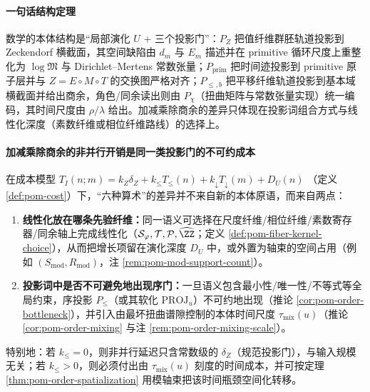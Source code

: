 \paragraph{一句话结构定理}
数学的本体结构是“局部演化 $U$ + 三个投影门”：$P_Z$ 把值纤维群胚轨道投影到 Zeckendorf 横截面，其空间缺陷由 $d_m$ 与 $E_m$ 描述并在 primitive 循环尺度上重整化为 $\log\mathfrak{M}$ 与 Dirichlet--Mertens 常数张量；$P_{\mathrm{prim}}$ 把时间迹投影到 primitive 原子层并与 $Z=E\circ M\circ T$ 的交换图严格对齐；$P_{\le,b}$ 把平移纤维轨道投影到基本域横截面并给出商余，角色/同余读出则由 $P_\chi$（扭曲矩阵与常数张量实现）统一编码，其时间尺度由 $\rho/\lambda$ 给出。加减乘除商余的差异只体现在投影词组合方式与线性化深度（素数纤维或相位纤维路线）的选择上。

\paragraph{加减乘除商余的非并行开销是同一类投影门的不可约成本}
在成本模型
\(
T_I(n;m)=k_Z\delta_Z+k_{\le}T_{\le}(n)+k_{\downarrow}T_{\downarrow}(m)+D_U(n)
\)
（定义 \ref{def:pom-cost}）下，“六种算术”的差异并不来自新的本体原语，而来自两点：
\begin{enumerate}
  \item \textbf{线性化放在哪条先验纤维：}同一语义可选择在尺度纤维/相位纤维/素数寄存器/同余轴上完成线性化（\(\mathcal{S}_\varphi,\mathcal{T},\mathcal{P},\widehat{\ZZ}\)；定义 \ref{def:pom-fiber-kernel-choice}），从而把增长项留在演化深度 \(D_U\) 中，或外置为轴束的空间占用（例如 \((S_{\mathrm{mod}},R_{\mathrm{mod}})\)，注 \ref{rem:pom-mod-support-count}）。
  \item \textbf{投影词中是否不可避免地出现序门：}一旦语义包含最小性/唯一性/不等式等全局约束，序投影 \(P_{\le}\)（或其软化 \(\mathrm{PROJ}_u\)）不可约地出现（推论 \ref{cor:pom-order-bottleneck}），并引入由最坏扭曲谱隙控制的本体时间尺度 \(\tau_{\mathrm{mix}}(u)\)（推论 \ref{cor:pom-order-mixing} 与注 \ref{rem:pom-order-mixing-scale}）。
\end{enumerate}
特别地：若 \(k_{\le}=0\)，则非并行延迟只含常数级的 \(\delta_Z\)（规范投影门），与输入规模无关；若 \(k_{\le}>0\)，则必须付出由 \(\tau_{\mathrm{mix}}(u)\) 刻度的时间成本，并可按定理 \ref{thm:pom-order-spatialization} 用模轴束把该时间瓶颈空间化转移。

